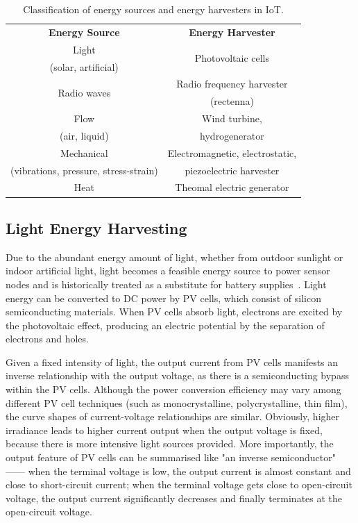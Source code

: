 \begin{table}
    \renewcommand{\arraystretch}{1.2}
    \centering
    \begin{tabular}{|c|c|}
    \hline
    \multirow{2}{*}{\textbf{Energy Source}} & \multirow{2}{*}{\textbf{Energy Harvester}} \\
    & \\ 
    \hline
    Light & \multirow{2}{*}{Photovoltaic cells} \\
    (solar, artificial) & \\ 
    \hline
    \multirow{2}{*}{Radio waves} & Radio frequency harvester \\ 
    & (rectenna) \\ 
    \hline
    Flow & Wind turbine, \\ 
    (air, liquid) & hydrogenerator \\ 
    \hline
    Mechanical & Electromagnetic, electrostatic, \\ 
    (vibrations, pressure, stress-strain) & piezoelectric harvester \\ 
    \hline
    \multirow{2}{*}{Heat} & \multirow{2}{*}{Theomal electric generator} \\
    & \\  
    \hline
    \end{tabular}
    \caption{Classification of energy sources and energy harvesters in IoT.}
    \label{tab:energysources}
\end{table}

\subsection{Light Energy Harvesting}

Due to the abundant energy amount of light, whether from outdoor sunlight or indoor artificial light, light becomes a feasible energy source to power sensor nodes and is historically treated as a substitute for battery supplies~\cite{raghunathan2005design, seah2009wireless}. 
Light energy can be converted to DC power by PV cells, which consist of silicon semiconducting materials. 
When PV cells absorb light, electrons are excited by the photovoltaic effect, producing an electric potential by the separation of electrons and holes.

Given a fixed intensity of light, the output current from PV cells manifests an inverse relationship with the output voltage, as there is a semiconducting bypass within the PV cells. Although the power conversion efficiency may vary among different PV cell techniques (such as monocrystalline, polycrystalline, thin film), the curve shapes of current-voltage relationships are similar. Obviously, higher irradiance leads to higher current output when the output voltage is fixed, because there is more intensive light sources provided. More importantly, the output feature of PV cells can be summarised like "an inverse semiconductor" ------ when the terminal voltage is low, the output current is almost constant and close to short-circuit current; when the terminal voltage gets close to open-circuit voltage, the output current significantly decreases and finally terminates at the open-circuit voltage. 

